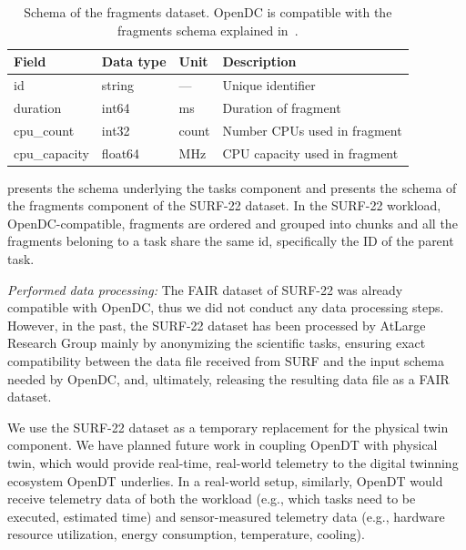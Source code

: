 \begin{table}[t]
\centering
\renewcommand{\arraystretch}{1.1}
\begin{tabularx}{\linewidth}{l l l X}
\toprule
\textbf{Field} & \textbf{Data type} & \textbf{Unit} & \textbf{Description} \\
\midrule
id            & string  & —    & Unique identifier \\
duration      & int64   & ms   & Duration of fragment \\
cpu\_count     & int32   & count& Number CPUs used in fragment \\
cpu\_capacity  & float64 & MHz  & CPU capacity used in fragment \\
\bottomrule
\end{tabularx}
\caption{Schema of the fragments dataset. OpenDC is compatible with the fragments schema explained in~\cite{opendc-workload}.}
\label{tab:fragments_schema}
\end{table}

 presents the schema underlying the tasks component and  presents the schema of the fragments component of the SURF-22 dataset. In the SURF-22 workload, OpenDC-compatible, fragments are ordered and grouped into chunks and all the fragments beloning to a task share the same id, specifically the ID of the parent task.

\textit{Performed data processing:} The FAIR dataset of SURF-22 was already compatible with OpenDC, thus we did not conduct any data processing steps. However, in the past, the SURF-22 dataset has been processed by AtLarge Research Group mainly by anonymizing the scientific tasks, ensuring exact compatibility between the data file received from SURF and the input schema needed by OpenDC, and, ultimately, releasing the resulting data file as a FAIR dataset.

We use the SURF-22 dataset as a temporary replacement for the physical twin component. We have planned future work in coupling OpenDT with physical twin, which would provide real-time, real-world telemetry to the digital twinning ecosystem OpenDT underlies. In a real-world setup, similarly, OpenDT would receive telemetry data of both the workload (e.g., which tasks need to be executed, estimated time) and sensor-measured telemetry data (e.g., hardware resource utilization, energy consumption, temperature, cooling).


